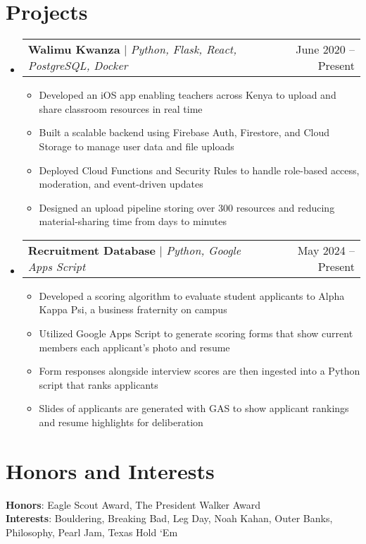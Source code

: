 \documentclass[letterpaper,11pt]{article}
\makeatletter
\newcommand{\resumeItem}[1]{
  \item\small{
    {#1 \vspace{-2pt}}
  }
}
\newcommand{\resumeProjectHeading}[2]{
    \item
    \begin{tabular*}{0.97\textwidth}{l@{\extracolsep{\fill}}r}
      \small#1 & #2 \\
    \end{tabular*}\vspace{-7pt}
}
\newcommand{\resumeSubHeadingListStart}{\begin{itemize}[leftmargin=0.0in, label={}]}
\newcommand{\resumeSubHeadingListEnd}{\end{itemize}}
\newcommand{\resumeItemListStart}{\begin{itemize}}
\newcommand{\resumeItemListEnd}{\end{itemize}\vspace{-5pt}}
\makeatother
\begin{document}
\section{Projects}
    \resumeSubHeadingListStart
      \resumeProjectHeading
          {\textbf{Walimu Kwanza} $|$ \emph{Python, Flask, React, PostgreSQL, Docker}}{June 2020 -- Present}
          \resumeItemListStart
            \resumeItem{Developed an iOS app enabling teachers across Kenya to upload and share classroom resources in real time}
            \resumeItem{Built a scalable backend using Firebase Auth, Firestore, and Cloud Storage to manage user data and file uploads}
            \resumeItem{Deployed Cloud Functions and Security Rules to handle role-based access, moderation, and event-driven updates}
            \resumeItem{Designed an upload pipeline storing over 300 resources and reducing material-sharing time from days to minutes}
          \resumeItemListEnd
      \resumeProjectHeading
          {\textbf{Recruitment Database} $|$ \emph{Python, Google Apps Script}}{May 2024 -- Present}
          \resumeItemListStart
            \resumeItem{Developed a scoring algorithm to evaluate student applicants to Alpha Kappa Psi, a business fraternity on campus}
            \resumeItem{Utilized Google Apps Script to generate scoring forms that show current members each applicant's photo and resume}
            \resumeItem{Form responses alongside interview scores are then ingested into a Python script that ranks applicants}
            \resumeItem{Slides of applicants are generated with GAS to show applicant rankings and resume highlights for deliberation}
          \resumeItemListEnd
    \resumeSubHeadingListEnd



%
\section{Honors and Interests}
 \begin{itemize}[leftmargin=0.0in, label={}]
    \small{\item{
     \textbf{Honors}{: Eagle Scout Award, The President Walker Award} \\
     \textbf{Interests}{: Bouldering, Breaking Bad, Leg Day, Noah Kahan, Outer Banks, Philosophy, Pearl Jam, Texas Hold ‘Em} \\
    }}
 \end{itemize}


\end{document}
